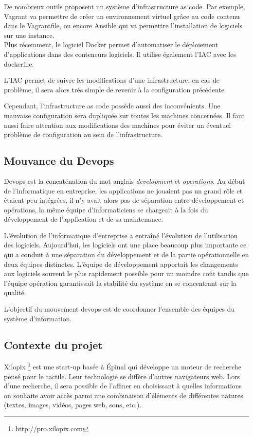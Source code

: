 \documentclass[]{article}
\begin{document}
De nombreux outils proposent un système d'infrastructure as code. Par exemple, Vagrant va permettre de créer un environnement virtuel grâce au code contenu dans
le Vagrantfile, ou encore Ansible qui va permettre l'installation de logiciels sur une instance. \\
Plus récemment, le logiciel Docker permet
d'automatiser le déploiement d'applications dans des conteneurs
logiciels. Il utilise également l'IAC avec les dockerfile. 

L'IAC permet de suivre les modifications d'une
infrastructure, en cas de problème, il sera alors très simple de revenir
à la configuration précédente. 

Cependant, l'infrastructure as code possède aussi des inconvénients. Une mauvaise configuration sera dupliquée sur toutes les machines concernées.
Il faut aussi faire attention aux modifications des machines pour éviter un éventuel problème de configuration au sein de l'infrastructure.
\subsection{Mouvance du Devops}\label{mouvance-devops}
Devops est la concaténation du mot anglais \emph{development} et
\emph{operations}. Au début de l'informatique en
entreprise, les applications ne jouaient pas un grand rôle et étaient
peu intégrées, il n'y avait alors pas de séparation entre développement
et opérations, la même équipe d'informaticiens se chargeait à la fois du
développement de l'application et de sa maintenance.

L'évolution de l'informatique d'entreprise a entraîné l'évolution de
l'utilisation des logiciels. Aujourd'hui, les logiciels ont une place
beaucoup plus importante ce qui a conduit à une
séparation du développement et de la partie opérationnelle en deux
équipes distinctes. L'équipe de développement apportait les changements
aux logiciels souvent le plus rapidement possible pour un moindre coût
tandis que l'équipe opération garantissait la stabilité du système en se
concentrant sur la qualité. 

L'objectif du mouvement devops est de coordonner l'ensemble des équipes du système d'information.

\subsection{Contexte du projet}\label{contexte-du-projet}
Xilopix \footnote{http://pro.xilopix.com} est une start-up basée à Épinal qui
développe un moteur de recherche pensé pour le tactile. Leur
technologie se diffère d'autres navigateurs web. Lors d'une
recherche, il sera possible de l'affiner en choisissant à quelles informations on souhaite avoir accès parmi une combinaison d'éléments de différentes natures
(textes, images, vidéos, pages web, sons, etc.).
\end{document}
